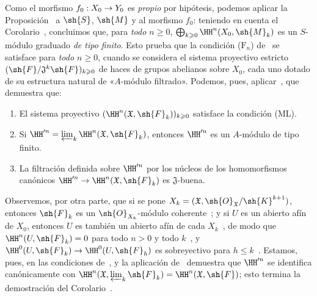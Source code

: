\documentclass[oneside]{amsart}
\makeatletter
\renewcommand{\leq}{\leqslant}
\renewcommand{\geq}{\geqslant}
\newcommand{\ega@arrow}[2]{\mathchoice{#1}{#2}{#2}{#2}}
\renewcommand{\to}{\ega@arrow{\longrightarrow}{\rightarrow}}
\makeatother
\begin{document}
Como el morfismo $f_0:X_0\to Y_0$ es \emph{propio} por hipótesis, podemos aplicar la Proposición~ a $\sh{S}$, $\sh{M}$ y al morfismo $f_0$: teniendo en cuenta el Corolario~, concluimos que, para \emph{todo $n\geq 0$}, $\bigoplus_{k\geq 0}\HH^n(X_0,\sh{M}_k)$ es un $S$-módulo graduado \emph{de tipo finito}.
Esto prueba que la condición ($\text{F}_n$) de~ se satisface para \emph{todo $n\geq 0$}, cuando se considera el sistema proyectivo estricto $(\sh{F}/\mathfrak{J}^k\sh{F})_{k\geq 0}$ de haces de grupos abelianos sobre $X_0$, cada uno dotado de su estructura natural de «$A$-módulo filtrado».
Podemos, pues, aplicar~, que demuestra que:
\begin{enumerate}
  \item[1.º] El sistema proyectivo $(\HH^n(\mathfrak{X},\sh{F}_k))_{k\geq 0}$ satisface la condición (ML).
  \item[2.º] Si $\HH^{\prime n}=\varprojlim_k\HH^n(\mathfrak{X},\sh{F}_k)$, entonces $\HH^{\prime n}$ es un $A$-módulo de tipo finito.
  \item[3.º] La filtración definida sobre $\HH^{\prime n}$ por los núcleos de los homomorfismos canónicos $\HH^{\prime n}\to\HH^n(\mathfrak{X},\sh{F}_k)$ es $\mathfrak{J}$-buena.
\end{enumerate}

Observemos, por otra parte, que si se pone $X_k=(\mathfrak{X},\sh{O}_\mathfrak{X}/\sh{K}^{k+1})$, entonces $\sh{F}_k$ es un $\sh{O}_{X_k}$-módulo coherente~; y si $U$ es un abierto afín de $X_0$, entonces $U$ es también un abierto afín de cada $X_k$~, de modo que $\HH^n(U,\sh{F}_k)=0$ para todo $n>0$ y todo $k$~, y $\HH^0(U,\sh{F}_k)\to\HH^0(U,\sh{F}_h)$ es sobreyectivo para $h\leq k$~.
Estamos, pues, en las condiciones de~, y la aplicación de~ demuestra que $\HH^{\prime n}$ se identifica canónicamente con $\HH^n(\mathfrak{X},\varprojlim_k\sh{F}_k)=\HH^n(\mathfrak{X},\sh{F})$; esto termina la demostración del Corolario~.
\end{document}
